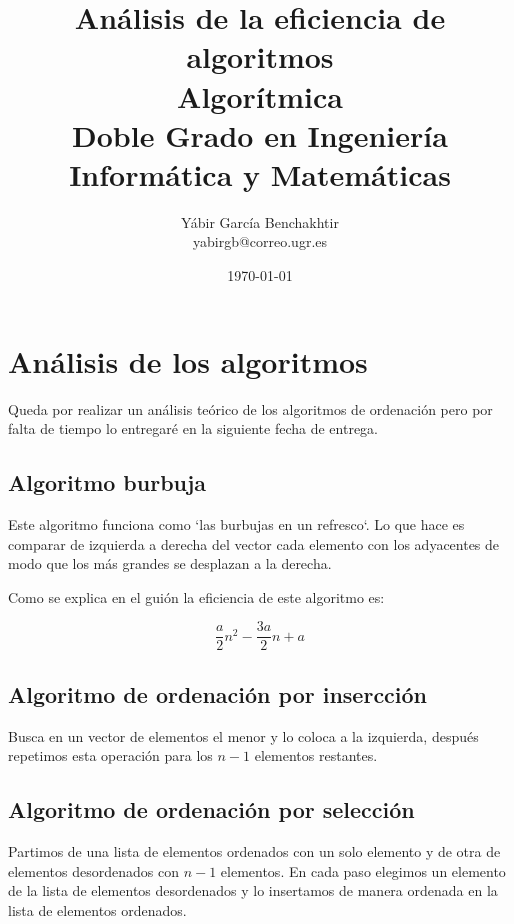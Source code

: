 \documentclass{article}
\begin{document}
\title{%
  \huge Análisis de la eficiencia de algoritmos \\[5mm]
  \Large Algorítmica\\
  \normalsize Doble Grado en Ingeniería Informática y Matemáticas\\[5cm]
}
\author{Yábir García Benchakhtir \\ yabirgb@correo.ugr.es \\[10cm]}

\date{\today}
\maketitle

\newpage
\tableofcontents
\newpage

\section{Análisis de los algoritmos}

Queda por realizar un análisis teórico de los algoritmos de ordenación
pero por falta de tiempo lo entregaré en la siguiente fecha de
entrega.

\subsection{Algoritmo burbuja}

Este algoritmo funciona como `las burbujas en un refresco`. Lo que
hace es comparar de izquierda a derecha del vector cada elemento con
los adyacentes de modo que los más grandes se desplazan a la derecha.

Como se explica en el guión la eficiencia de este algoritmo es:

$$ \frac{a}{2}n^2 - \frac{3a}{2}n + a $$

\subsection{Algoritmo de ordenación por insercción}

Busca en un vector de elementos el menor y lo coloca a la izquierda,
después repetimos esta operación para los $n-1$ elementos restantes.

\subsection{Algoritmo de ordenación por selección}

Partimos de una lista de elementos ordenados con un solo elemento y de
otra de elementos desordenados con $n-1$ elementos. En cada paso
elegimos un elemento de la lista de elementos desordenados y lo
insertamos de manera ordenada en la lista de elementos ordenados.
\end{document}
